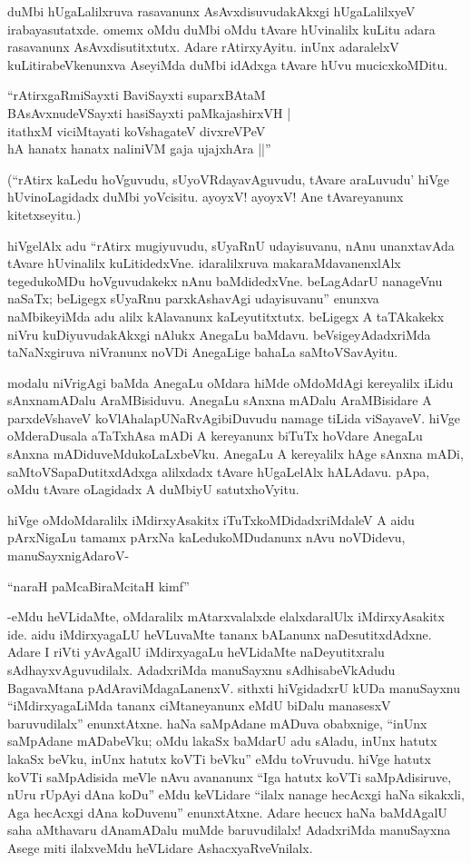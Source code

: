 duMbi hUgaLalilxruva rasavanunx AsAvxdisuvudakAkxgi hUgaLalilxyeV irabayasutatxde. omemx oMdu duMbi oMdu tAvare hUvinalilx kuLitu adara rasavanunx AsAvxdisutitxtutx. Adare rAtirxyAyitu. inUnx adaralelxV kuLitirabeVkenunxva AseyiMda duMbi idAdxga tAvare hUvu mucicxkoMDitu.

\begin{shloka}
``rAtirxgaRmiSayxti BaviSayxti suparxBAtaM\\
BAsAvxnudeVSayxti hasiSayxti paMkajashirxVH |\\
itathxM viciMtayati koVshagateV divxreVPeV\\
hA hanatx hanatx naliniVM gaja ujajxhAra ||''
\end{shloka}

(``rAtirx kaLedu hoVguvudu, sUyoVRdayavAguvudu, tAvare araLuvudu' hiVge hUvinoLagidadx duMbi yoVcisitu. ayoyxV! ayoyxV! Ane tAvareyanunx kitetxseyitu.)

hiVgelAlx adu ``rAtirx mugiyuvudu, sUyaRnU udayisuvanu, nAnu unanxtavAda tAvare hUvinalilx kuLitidedxVne. idaralilxruva makaraMdavanenxlAlx tegedukoMDu hoVguvudakekx nAnu baMdidedxVne. beLagAdarU nanageVnu naSaTx; beLigegx sUyaRnu parxkAshavAgi udayisuvanu'' enunxva naMbikeyiMda adu alilx kAlavanunx kaLeyutitxtutx. beLigegx A taTAkakekx niVru kuDiyuvudakAkxgi nAlukx AnegaLu baMdavu. beVsigeyAdadxriMda taNaNxgiruva niVranunx noVDi AnegaLige bahaLa saMtoVSavAyitu.

modalu niVrigAgi baMda AnegaLu oMdara hiMde oMdoMdAgi kereyalilx iLidu sAnxnamADalu AraMBisiduvu. AnegaLu sAnxna mADalu AraMBisidare A parxdeVshaveV koVlAhalapUNaRvAgibiDuvudu namage tiLida viSayaveV. hiVge oMderaDusala aTaTxhAsa mADi A kereyanunx biTuTx hoVdare AnegaLu sAnxna mADiduveMdukoLaLxbeVku. AnegaLu A kereyalilx hAge sAnxna mADi, saMtoVSapaDutitxdAdxga alilxdadx tAvare hUgaLelAlx hALAdavu. pApa, oMdu tAvare oLagidadx A duMbiyU satutxhoVyitu.

hiVge oMdoMdaralilx iMdirxyAsakitx iTuTxkoMDidadxriMdaleV A aidu pArxNigaLu tamamx pArxNa kaLedukoMDudanunx nAvu noVDidevu, manuSayxnigAdaroV-

\begin{shloka}
``naraH paMcaBiraMcitaH kimf''
\end{shloka}

-eMdu heVLidaMte, oMdaralilx mAtarxvalalxde elalxdaralUlx iMdirxyAsakitx ide. aidu iMdirxyagaLU heVLuvaMte tananx bALanunx naDesutitxdAdxne. Adare I riVti yAvAgalU iMdirxyagaLu heVLidaMte naDeyutitxralu sAdhayxvAguvudilalx. AdadxriMda manuSayxnu sAdhisabeVkAdudu BagavaMtana pAdAraviMdagaLanenxV. sithxti hiVgidadxrU kUDa manuSayxnu ``iMdirxyagaLiMda tananx ciMtaneyanunx eMdU biDalu manasesxV baruvudilalx'' enunxtAtxne. haNa saMpAdane mADuva obabxnige, ``inUnx saMpAdane mADabeVku; oMdu lakaSx baMdarU adu sAladu, inUnx hatutx lakaSx beVku, inUnx hatutx koVTi beVku'' eMdu toVruvudu. hiVge hatutx koVTi saMpAdisida meVle nAvu avananunx ``Iga hatutx koVTi saMpAdisiruve, nUru rUpAyi dAna koDu'' eMdu keVLidare ``ilalx nanage hecAcxgi haNa sikakxli, Aga hecAcxgi dAna koDuvenu'' enunxtAtxne. Adare hecucx haNa baMdAgalU saha aMthavaru dAnamADalu muMde baruvudilalx! AdadxriMda manuSayxna Asege miti ilalxveMdu heVLidare AshacxyaRveVnilalx.

